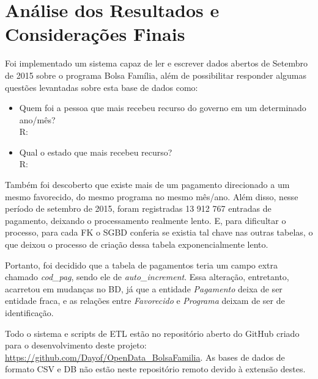 \documentclass[12pt]{article}
\begin{document}
	\section{Análise dos Resultados e Considerações Finais}
	\label{sec:resultados}
	
	Foi implementado um sistema capaz de ler e escrever dados abertos de Setembro de 2015 sobre o programa Bolsa Família, além de possibilitar responder algumas questões levantadas sobre esta base de dados como:
	
	\begin{itemize}
		\item Quem foi a pessoa que mais recebeu  recurso do governo em um determinado ano/mês? \\
		R: 
		\item Qual o estado que mais recebeu recurso? \\
		R: 
	\end{itemize}
	
	Também foi descoberto que existe mais de um pagamento direcionado a um mesmo favorecido, do mesmo programa no mesmo mês/ano. Além disso, nesse período de setembro de 2015, foram registradas 13 912 767 entradas de pagamento, deixando o processamento realmente lento. E, para dificultar o processo, para cada FK o SGBD conferia se existia tal chave nas outras tabelas, o que deixou o processo de criação dessa tabela exponencialmente lento.
	
	Portanto, foi decidido que a tabela de pagamentos teria um campo extra chamado \emph{cod{\_}pag}, sendo ele de \emph{auto{\_}increment}. Essa alteração, entretanto, acarretou em mudanças no BD, já que a entidade \emph{Pagamento} deixa de ser entidade fraca, e as relações entre \emph{Favorecido} e \emph{Programa} deixam de ser de identificação.
	
	Todo o sistema e scripts de ETL estão no repositório aberto do GitHub criado para o desenvolvimento deste projeto: \url{https://github.com/Dayof/OpenData_BolsaFamilia}. As bases de dados de formato CSV e DB não estão neste repositório remoto devido à extensão destes.
	

 

	
\end{document}
